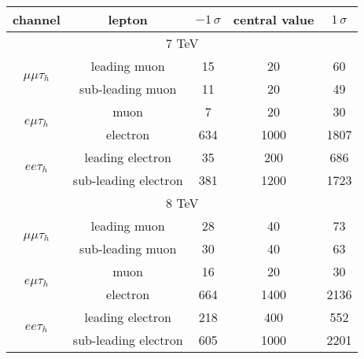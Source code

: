 
\centering
\begin{tabular}{|c|c|c|c|c|}
\hline
channel & lepton & $-1\,\sigma$ & central value & $1\,\sigma$ \\
\hline
\multicolumn{5}{|c|}{7 TeV} \\
\hline
\multirow{2}{*}{ $\mu\mu\tau_h$ }& leading muon & 15 & 20 & 60\\
& sub-leading muon & 11 & 20 & 49\\
\hline
\multirow{2}{*}{ $e\mu\tau_h$ }& muon & 7 & 20 & 30\\
& electron & 634 & 1000 & 1807\\
\hline
\multirow{2}{*}{ $ee\tau_h$ }& leading electron & 35 & 200 & 686\\
& sub-leading electron & 381 & 1200 & 1723\\
\hline
\multicolumn{5}{|c|}{8 TeV} \\
\hline
\multirow{2}{*}{ $\mu\mu\tau_h$ }& leading muon & 28 & 40 & 73\\
& sub-leading muon & 30 & 40 & 63\\
\hline
\multirow{2}{*}{ $e\mu\tau_h$ }& muon & 16 & 20 & 30\\
& electron & 664 & 1400 & 2136\\
\hline
\multirow{2}{*}{ $ee\tau_h$ }& leading electron & 218 & 400 & 552\\
& sub-leading electron & 605 & 1000 & 2201\\
\hline
\end{tabular}
